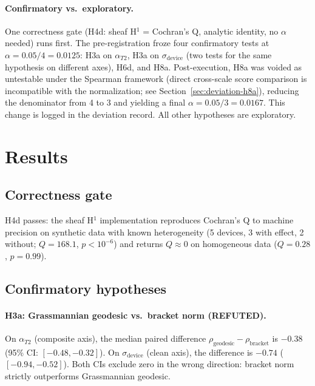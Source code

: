 \documentclass[11pt]{article}
\begin{document}
\paragraph{Confirmatory vs.\ exploratory.}
One correctness gate (H4d: sheaf H$^1$ = Cochran's Q, analytic
identity, no $\alpha$ needed) runs first.  The pre-registration froze
four confirmatory tests at $\alpha = 0.05/4 = 0.0125$: H3a on
$\alpha_{T2}$, H3a on $\sigma_\text{device}$ (two tests for the same
hypothesis on different axes), H6d, and H8a.  Post-execution, H8a was
voided as untestable under the Spearman framework (direct cross-scale
score comparison is incompatible with the normalization; see
Section~\ref{sec:deviation-h8a}), reducing the denominator from 4 to 3
and yielding a final $\alpha = 0.05/3 = 0.0167$.  This change is logged
in the deviation record.  All other hypotheses are exploratory.

\section{Results}
\label{sec:results}

\subsection{Correctness gate}

H4d passes: the sheaf H$^1$ implementation reproduces Cochran's Q to
machine precision on synthetic data with known heterogeneity (5 devices,
3 with effect, 2 without; $Q = 168.1$, $p < 10^{-6}$) and returns
$Q \approx 0$ on homogeneous data ($Q = 0.28$, $p = 0.99$).

\subsection{Confirmatory hypotheses}

\paragraph{H3a: Grassmannian geodesic vs.\ bracket norm (REFUTED).}
On $\alpha_{T2}$ (composite axis), the median paired difference
$\rho_\text{geodesic} - \rho_\text{bracket}$ is $-0.38$ (95\% CI:
$[-0.48, -0.32]$).  On $\sigma_\text{device}$ (clean axis), the
difference is $-0.74$ ($[-0.94, -0.52]$).  Both CIs exclude zero in
the wrong direction: bracket norm strictly outperforms Grassmannian
geodesic.
\end{document}
